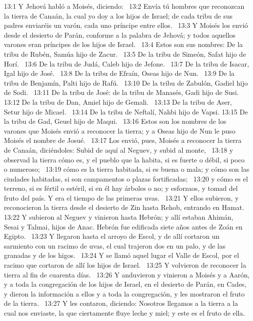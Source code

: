 13:1 Y Jehová habló a Moisés, diciendo:  
13:2 Envía tú hombres que reconozcan la tierra de Canaán, la cual yo doy a los hijos de Israel; de cada tribu de sus padres enviaréis un varón, cada uno príncipe entre ellos.  
13:3 Y Moisés los envió desde el desierto de Parán, conforme a la palabra de Jehová; y todos aquellos varones eran príncipes de los hijos de Israel.  
13:4 Estos son sus nombres: De la tribu de Rubén, Samúa hijo de Zacur.  
13:5 De la tribu de Simeón, Safat hijo de Horí.  
13:6 De la tribu de Judá, Caleb hijo de Jefone.  
13:7 De la tribu de Isacar, Igal hijo de José.  
13:8 De la tribu de Efraín, Oseas hijo de Nun.  
13:9 De la tribu de Benjamín, Palti hijo de Rafú.  
13:10 De la tribu de Zabulón, Gadiel hijo de Sodi.  
13:11 De la tribu de José: de la tribu de Manasés, Gadi hijo de Susi.  
13:12 De la tribu de Dan, Amiel hijo de Gemali.  
13:13 De la tribu de Aser, Setur hijo de Micael.  
13:14 De la tribu de Neftalí, Nahbi hijo de Vapsi. 
13:15 De la tribu de Gad, Geuel hijo de Maqui.  
13:16 Estos son los nombres de los varones que Moisés envió a reconocer la tierra; y a Oseas hijo de Nun le puso Moisés el nombre de Josué.  
13:17 Los envió, pues, Moisés a reconocer la tierra de Canaán, diciéndoles: Subid de aquí al Neguev, y subid al monte,  
13:18 y observad la tierra cómo es, y el pueblo que la habita, si es fuerte o débil, si poco o numeroso;  
13:19 cómo es la tierra habitada, si es buena o mala; y cómo son las ciudades habitadas, si son campamentos o plazas fortificadas;  
13:20 y cómo es el terreno, si es fértil o estéril, si en él hay árboles o no; y esforzaos, y tomad del fruto del país. Y era el tiempo de las primeras uvas.  
13:21 Y ellos subieron, y reconocieron la tierra desde el desierto de Zin hasta Rehob, entrando en Hamat.  
13:22 Y subieron al Neguev y vinieron hasta Hebrón; y allí estaban Ahimán, Sesai y Talmai, hijos de Anac. Hebrón fue edificada siete años antes de Zoán en Egipto.  
13:23 Y llegaron hasta el arroyo de Escol, y de allí cortaron un sarmiento con un racimo de uvas, el cual trajeron dos en un palo, y de las granadas y de los higos.  
13:24 Y se llamó aquel lugar el Valle de Escol, por el racimo que cortaron de allí los hijos de Israel.  
13:25 Y volvieron de reconocer la tierra al fin de cuarenta días.  
13:26 Y anduvieron y vinieron a Moisés y a Aarón, y a toda la congregación de los hijos de Israel, en el desierto de Parán, en Cades, y dieron la información a ellos y a toda la congregación, y les mostraron el fruto de la tierra.  
13:27 Y les contaron, diciendo: Nosotros llegamos a la tierra a la cual nos enviaste, la que ciertamente fluye leche y miel; y este es el fruto de ella.  
